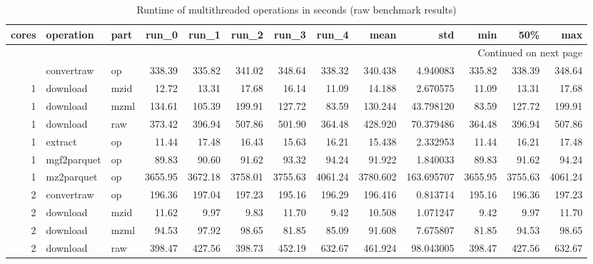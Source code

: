 \begin{longtable}{rllrrrrrrrrrr}
\caption{Runtime of multithreaded \mmproteo{} operations in seconds (raw benchmark results)}\label{tab:mmproteoMultithreadingBenchmarkRaw}\\
\toprule
 cores &    operation &  part &    run\_0 &    run\_1 &    run\_2 &    run\_3 &    run\_4 &      mean &         std &      min &      50\% &      max \\
\midrule
\endhead
\midrule
\multicolumn{13}{r}{{Continued on next page}} \\
\midrule
\endfoot

\bottomrule
\endlastfoot
     1 &   convertraw &    op &   338.39 &   335.82 &   341.02 &   348.64 &   338.32 &   340.438 &    4.940083 &   335.82 &   338.39 &   348.64 \\
     1 &     download &  mzid &    12.72 &    13.31 &    17.68 &    16.14 &    11.09 &    14.188 &    2.670575 &    11.09 &    13.31 &    17.68 \\
     1 &     download &  mzml &   134.61 &   105.39 &   199.91 &   127.72 &    83.59 &   130.244 &   43.798120 &    83.59 &   127.72 &   199.91 \\
     1 &     download &   raw &   373.42 &   396.94 &   507.86 &   501.90 &   364.48 &   428.920 &   70.379486 &   364.48 &   396.94 &   507.86 \\
     1 &      extract &    op &    11.44 &    17.48 &    16.43 &    15.63 &    16.21 &    15.438 &    2.332953 &    11.44 &    16.21 &    17.48 \\
     1 &  mgf2parquet &    op &    89.83 &    90.60 &    91.62 &    93.32 &    94.24 &    91.922 &    1.840033 &    89.83 &    91.62 &    94.24 \\
     1 &   mz2parquet &    op &  3655.95 &  3672.18 &  3758.01 &  3755.63 &  4061.24 &  3780.602 &  163.695707 &  3655.95 &  3755.63 &  4061.24 \\
     2 &   convertraw &    op &   196.36 &   197.04 &   197.23 &   195.16 &   196.29 &   196.416 &    0.813714 &   195.16 &   196.36 &   197.23 \\
     2 &     download &  mzid &    11.62 &     9.97 &     9.83 &    11.70 &     9.42 &    10.508 &    1.071247 &     9.42 &     9.97 &    11.70 \\
     2 &     download &  mzml &    94.53 &    97.92 &    98.65 &    81.85 &    85.09 &    91.608 &    7.675807 &    81.85 &    94.53 &    98.65 \\
     2 &     download &   raw &   398.47 &   427.56 &   398.73 &   452.19 &   632.67 &   461.924 &   98.043005 &   398.47 &   427.56 &   632.67 \\

\end{longtable}
